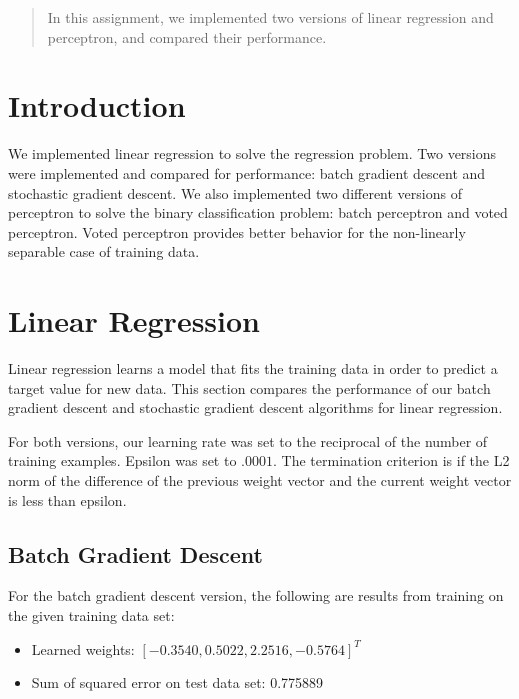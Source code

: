 \documentclass[12pt]{article}
\begin{document}
\maketitle

\begin{abstract}
In this assignment, we implemented two versions of linear regression and perceptron, and compared their performance.
\end{abstract}

\section{Introduction}
We implemented linear regression to solve the regression problem. Two versions were implemented and compared for performance: batch gradient descent and stochastic gradient descent. We also implemented two different versions of perceptron to solve the binary classification problem: batch perceptron and voted perceptron. Voted perceptron provides better behavior for the non-linearly separable case of training data.

\section{Linear Regression}
Linear regression learns a model that fits the training data in order to predict a target value for new data. This section compares the performance of our batch gradient descent and stochastic gradient descent algorithms for linear regression.

For both versions, our learning rate was set to the reciprocal of the number of training examples. Epsilon was set to \(.0001\). The termination criterion is if the L2 norm of the difference of the previous weight vector and the current weight vector is less than epsilon.

\subsection{Batch Gradient Descent}
For the batch gradient descent version, the following are results from training on the given training data set:

\begin{itemize}
	\item Learned weights: \([-0.3540, 0.5022, 2.2516, -0.5764]^T\)
	\item Sum of squared error on test data set: 0.775889
\end{itemize}
\end{document}
